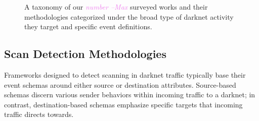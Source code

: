 \documentclass[manuscript,nonacm]{acmart}
\newcommand{\maxnote}[1]{\textit{\textcolor{violet}{#1 --Max}}}
\begin{document}

\begin{figure}
    \caption{A taxonomy of our \maxnote{number} surveyed works and their methodologies categorized under the broad type of darknet activity they target and specific event definitions.}
    \label{fig:taxonomy}
\end{figure}

\subsection{Scan Detection Methodologies}

Frameworks designed to detect scanning in darknet traffic typically base their event schemas around either source or destination attributes.
Source-based schemas discern various sender behaviors within incoming traffic to a darknet; in contrast, destination-based schemas emphasize specific targets that incoming traffic directs towards.
\vspace{0.25em}

\end{document}
